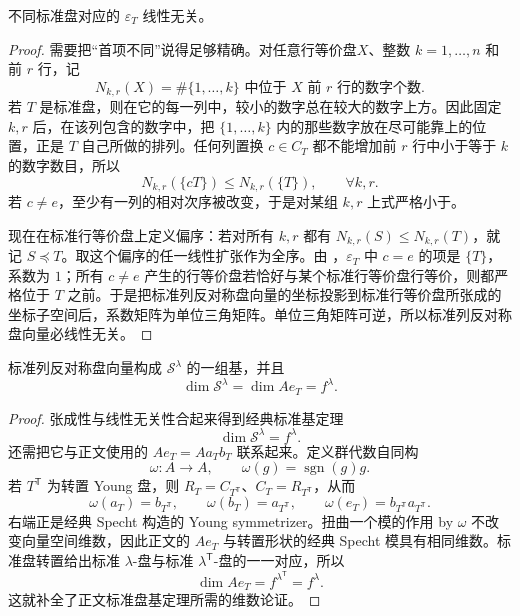 \begin{lemma}[标准列反对称盘向量线性无关]
不同标准盘对应的 $\varepsilon_T$ 线性无关。

\end{lemma}

\begin{proof}
需要把“首项不同”说得足够精确。对任意行等价盘$X$、整数 $k=1,\dots,n$ 和前 $r$ 行，记
\[
N_{k,r}(X)=\#\{1,\dots,k\}\text{ 中位于 }X\text{ 前 }r\text{ 行的数字个数}.
\]
若 $T$ 是标准盘，则在它的每一列中，较小的数字总在较大的数字上方。因此固定 $k,r$ 后，在该列包含的数字中，把 $\{1,\dots,k\}$ 内的那些数字放在尽可能靠上的位置，正是 $T$ 自己所做的排列。任何列置换 $c\in C_T$ 都不能增加前 $r$ 行中小于等于 $k$ 的数字数目，所以
\begin{equation}
N_{k,r}(\{cT\})\le N_{k,r}(\{T\}),
\qquad \forall k,r.
\label{eq:tabloid-dominance-triangular}
\end{equation}
若 $c\neq e$，至少有一列的相对次序被改变，于是对某组 $k,r$ 上式严格小于。

现在在标准行等价盘上定义偏序：若对所有 $k,r$ 都有 $N_{k,r}(S)\le N_{k,r}(T)$，就记 $S\preceq T$。取这个偏序的任一线性扩张作为全序。由 ，$\varepsilon_T$ 中 $c=e$ 的项是 $\{T\}$，系数为 $1$；所有 $c\neq e$ 产生的行等价盘若恰好与某个标准行等价盘行等价，则都严格位于 $T$ 之前。于是把标准列反对称盘向量的坐标投影到标准行等价盘所张成的坐标子空间后，系数矩阵为单位三角矩阵。单位三角矩阵可逆，所以标准列反对称盘向量必线性无关。
\end{proof}

\begin{theorem}
标准列反对称盘向量构成 $\mathscr S^\lambda$ 的一组基，并且
\[
\dim\mathscr S^\lambda=\dim Ae_T=f^\lambda.
\]
\end{theorem}

\begin{proof}
张成性与线性无关性合起来得到经典标准基定理
\begin{equation}
\dim\mathscr S^\lambda=f^\lambda.
\label{eq:standard-polytabloid-dimension-app}
\end{equation}
还需把它与正文使用的 $Ae_T=Aa_Tb_T$ 联系起来。定义群代数自同构
\[
\omega:A\to A,
\qquad
\omega(g)=\operatorname{sgn}(g)g.
\]
若 $T^{\mathsf T}$ 为转置 Young 盘，则 $R_T=C_{T^{\mathsf T}}$、$C_T=R_{T^{\mathsf T}}$，从而
\[
\omega(a_T)=b_{T^{\mathsf T}},
\qquad
\omega(b_T)=a_{T^{\mathsf T}},
\qquad
\omega(e_T)=b_{T^{\mathsf T}}a_{T^{\mathsf T}}.
\]
右端正是经典 Specht 构造的 Young symmetrizer。扭曲一个模的作用 by $\omega$ 不改变向量空间维数，因此正文的 $Ae_T$ 与转置形状的经典 Specht 模具有相同维数。标准盘转置给出标准 $\lambda$-盘与标准 $\lambda^{\mathsf T}$-盘的一一对应，所以
\[
\dim Ae_T=f^{\lambda^{\mathsf T}}=f^\lambda.
\]
这就补全了正文标准盘基定理所需的维数论证。
\end{proof}

